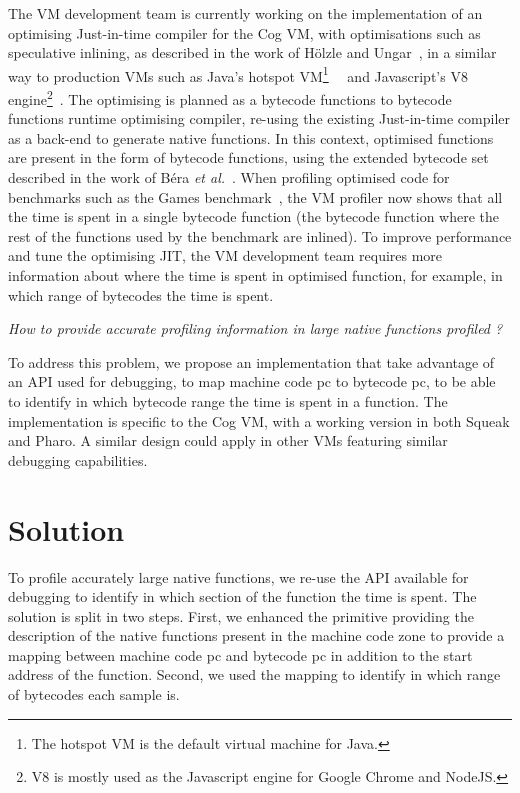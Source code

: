 \documentclass[10pt,preprint]{sigplanconf}
\newcommand{\etal}{\emph{et al.}\xspace}
\begin{document}
The VM development team is currently working on the implementation of an optimising Just-in-time compiler for the Cog VM, with optimisations such as speculative inlining, as described in the work of H\"olzle and Ungar~\cite{Holz94a}, in a similar way to production VMs such as Java's hotspot VM\footnote{The hotspot VM is the default virtual machine for Java.}~~\cite{Pale01a} and Javascript's V8 engine\footnote{V8 is mostly used as the Javascript engine for Google Chrome and NodeJS.}~\cite{V8}. The optimising is planned as a bytecode functions to bytecode functions runtime optimising compiler, re-using the existing Just-in-time compiler as a back-end to generate native functions. In this context, optimised functions are present in the form of bytecode functions, using the extended bytecode set described in the work of B\'era \etal~\cite{Bera14a}. When profiling optimised code for benchmarks such as the Games benchmark~\cite{GameBenchs}, the VM profiler now shows that all the time is spent in a single bytecode function (the bytecode function where the rest of the functions used by the benchmark are inlined). To improve performance and tune the optimising JIT, the VM development team requires more information about where the time is spent in optimised function, for example, in which range of bytecodes the time is spent.

\emph{How to provide accurate profiling information in large native functions profiled ?}

To address this problem, we propose an implementation that take advantage of an API used for debugging, to map machine code pc to bytecode pc, to be able to identify in which bytecode range the time is spent in a function. The implementation is specific to the Cog VM, with a working version in both Squeak and Pharo. A similar design could apply in other VMs featuring similar debugging capabilities.


\section{Solution}

To profile accurately large native functions, we re-use the API available for debugging to identify in which section of the function the time is spent. The solution is split in two steps. First, we enhanced the primitive providing the description of the native functions present in the machine code zone to provide a mapping between machine code pc and bytecode pc in addition to the start address of the function. Second, we used the mapping to identify in which range of bytecodes each sample is.
\end{document}

